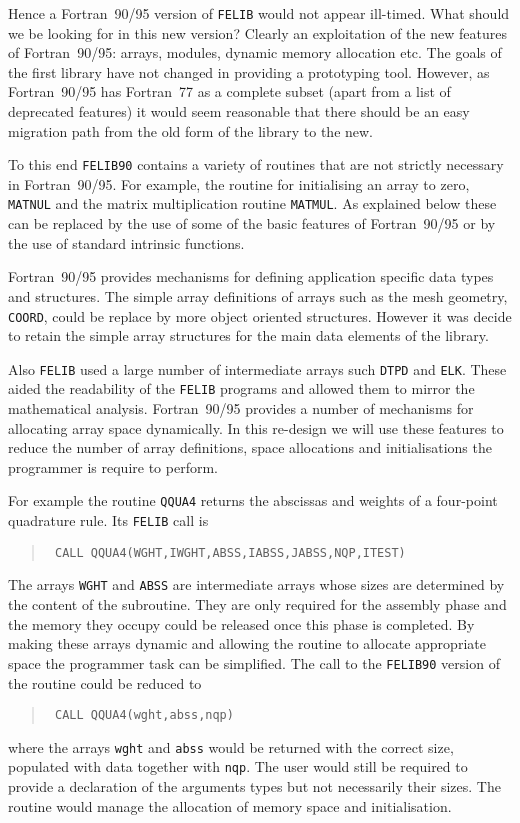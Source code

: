 \documentclass[a4paper,titlepage,11pt]{article}
\begin{document}
Hence a Fortran~90/95 version of {\tt FELIB} would not appear ill-timed. What should
we be looking for in this new version? Clearly an exploitation of the new features
of Fortran~90/95: arrays, modules, dynamic memory allocation etc. The goals of the first 
library have not changed in providing a prototyping tool. However, as Fortran~90/95 has
Fortran~77 as a complete subset (apart from a list of deprecated features) it
would seem reasonable that there should be an easy migration path from
the old form of the library to the new.

To this end {\tt FELIB90} contains a variety of routines that are not strictly
necessary in Fortran~90/95. For example, the routine for initialising an
array to zero, {\tt MATNUL} and the matrix multiplication routine
{\tt MATMUL}. As explained below these can be replaced by the use of
some of the basic features of Fortran~90/95 or by the use of standard
intrinsic functions.

Fortran~90/95 provides mechanisms for defining application specific data
types and structures. The simple array definitions of arrays such as the
mesh geometry, {\tt COORD}, could be replace by more object oriented
structures. However it was decide to retain the simple array structures
for the main data elements of the library.

Also {\tt FELIB} used a large number of intermediate arrays such {\tt DTPD} and
{\tt ELK}. These aided the readability of the {\tt FELIB} programs and allowed
them to mirror the mathematical analysis. Fortran~90/95 provides a number
of mechanisms for allocating array space dynamically. In this re-design we
will use these features to reduce the number of array definitions, space
allocations and initialisations the programmer is require to perform. 

For example the routine {\tt QQUA4} returns the abscissas and weights of a
four-point quadrature rule. Its {\tt FELIB} call is
\begin{quote}
\tt\source
CALL QQUA4(WGHT,IWGHT,ABSS,IABSS,JABSS,NQP,ITEST)
\end{quote}
The arrays {\tt WGHT} and {\tt ABSS} are intermediate arrays whose sizes are
determined by the content of the subroutine. They are only required for
the assembly phase and the memory they occupy could be released once this
phase is completed. By making these arrays dynamic and allowing the routine
to allocate appropriate space the programmer task can be simplified. The call to the
{\tt FELIB90} version of the routine could be reduced to
\begin{quote}
\tt\source
CALL QQUA4(wght,abss,nqp)
\end{quote}
where the arrays {\tt wght} and {\tt abss} would be returned with the correct
size, populated with data together with {\tt nqp}. The user would still be
required to provide a declaration of the arguments types but not necessarily
their sizes. The routine would manage the allocation of memory space and 
initialisation.
\end{document}
